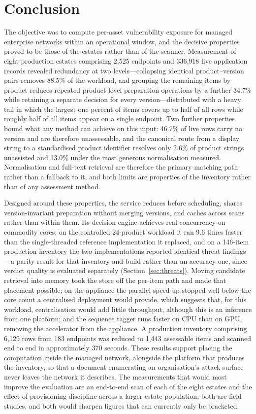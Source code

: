 \documentclass[fleqn,10pt,lineno]{wlpeerj}
\begin{document}
\section{Conclusion}
\label{sec:conclusion}
The objective was to compute per-asset vulnerability exposure for managed enterprise networks within an operational window, and the decisive properties proved to be those of the estates rather than of the scanner. Measurement of eight production estates comprising 2,525 endpoints and 336,918 live application records revealed redundancy at two levels---collapsing identical product--version pairs removes 88.5\% of the workload, and grouping the remaining items by product reduces repeated product-level preparation operations by a further 34.7\% while retaining a separate decision for every version---distributed with a heavy tail in which the largest one percent of items covers up to half of all rows while roughly half of all items appear on a single endpoint. Two further properties bound what any method can achieve on this input: 46.7\% of live rows carry no version and are therefore unassessable, and the canonical route from a display string to a standardised product identifier resolves only 2.6\% of product strings unassisted and 13.0\% under the most generous normalisation measured. Normalisation and full-text retrieval are therefore the primary matching path rather than a fallback to it, and both limits are properties of the inventory rather than of any assessment method.

Designed around these properties, the service reduces before scheduling, shares version-invariant preparation without merging versions, and caches across scans rather than within them. Its decision engine achieves real concurrency on commodity cores: on the controlled 24-product workload it ran 9.6 times faster than the single-threaded reference implementation it replaced, and on a 146-item production inventory the two implementations reported identical threat findings---a parity result for that inventory and build rather than an accuracy one, since verdict quality is evaluated separately (Section~\ref{sec:threats}). Moving candidate retrieval into memory took the store off the per-item path and made that placement possible; on the appliance the parallel speed-up stopped well below the core count a centralised deployment would provide, which suggests that, for this workload, centralisation would add little throughput, although this is an inference from one platform; and the sequence tagger runs faster on CPU than on GPU, removing the accelerator from the appliance. A production inventory comprising 6,129 rows from 183 endpoints was reduced to 1,443 assessable items and scanned end to end in approximately 370 seconds. These results support placing the computation inside the managed network, alongside the platform that produces the inventory, so that a document enumerating an organisation's attack surface never leaves the network it describes. The measurements that would most improve the evaluation are an end-to-end scan of each of the eight estates and the effect of provisioning discipline across a larger estate population; both are field studies, and both would sharpen figures that can currently only be bracketed.
\end{document}
